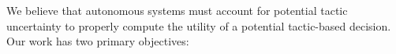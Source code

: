\documentclass{article}
\begin{document}






We believe that autonomous systems must account for potential tactic uncertainty to properly compute the utility of a potential tactic-based decision. Our work has two primary objectives:
\end{document}
